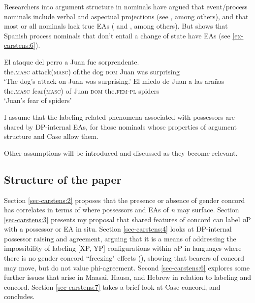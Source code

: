 \documentclass[output=paper
,modfonts
,nonflat]{langsci/langscibook}
\begin{document}
Researchers into argument structure in nominals have argued that event/process nominals include verbal and aspectual projections (see \citealt{Borer1993,Hazout1995}, among others), and that most or all nominals lack true EAs (\citealt{Picallo1991} and \citealt{Alexiadou2001}, among others). But \citet{Lopez2018} shows that Spanish process nominals that don’t entail a change of state have EAs (see \ref{ex-carstens:6}).

	\begin{exe}
		\ex \label{ex-carstens:6}
		\xlist
		\ex \citep [86]{Lopez2018}\newline
		\gll El         ataque        del     perro  a      Juan fue sorprendente.\\
		the.\textsc{masc}   attack(\textsc{masc}) of.the dog     \textsc{dom}    Juan      was surprising\\
		\glt `The dog's attack on Juan was surprising.' 	
		\ex \citep[91]{Lopez2018}\newline
		\gll El         miedo       de Juan a     las          arañas\\
		the.\textsc{masc}   fear(\textsc{masc})  of Juan  \textsc{dom}   the.\textsc{fem-pl}   spiders\\
		\glt `Juan's fear of spiders' 
		\endxlist
\end{exe}
I assume that the labeling-related phenomena associated with possessors are shared by DP-internal EAs, for those nominals whose properties of argument structure and Case allow them. 

Other assumptions will be introduced and discussed as they become relevant.

\subsection{Structure of the paper} \label{sec-carstens:1.5}
Section \ref{sec-carstens:2} proposes that the presence or absence of gender concord has correlates in terms of where possessors and EAs of \textit{n} may surface. Section \ref{sec-carstens:3} presents my proposal that shared features of concord can label \textit{n}P with a possessor or EA in situ. Section \ref{sec-carstens:4} looks at DP-internal possessor raising and agreement, arguing that it is a means of addressing the impossibility of labeling [XP, YP] configurations within \textit{n}P in languages where there is no gender concord ``freezing" effects (\citealt{Rizzi2006,Rizzi_Shlonsky2007}), showing that bearers of concord may move, but do not value phi-agreement. Second \ref{sec-carstens:6} explores some further issues that arise in Maasai, Hausa, and Hebrew in relation to labeling and concord. Section \ref{sec-carstens:7} takes a brief look at Case concord, and  concludes.
\end{document}
